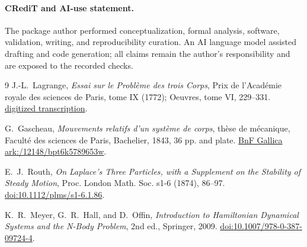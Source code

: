 \documentclass[10pt]{article}
\begin{document}
\paragraph{CRediT and AI-use statement.}
The package author performed conceptualization, formal analysis, software,
validation, writing, and reproducibility curation.  An AI language model
assisted drafting and code generation; all claims remain the author's
responsibility and are exposed to the recorded checks.
\fi

\begin{thebibliography}{9}
J.-L.~Lagrange, \emph{Essai sur le Probl\`eme des trois Corps}, Prix de
l'Acad\'emie royale des sciences de Paris, tome IX (1772); Oeuvres, tome VI,
229--331.  \href{https://fr.wikisource.org/wiki/M%C3%A9moires_extraits_des_recueils_de_l%E2%80%99Acad%C3%A9mie_des_sciences_de_Paris_et_de_l%E2%80%99Institut_de_France/Essai_sur_le_Probl%C3%A8me_des_trois_Corps}{digitized transcription}.

G.~Gascheau, \emph{Mouvements relatifs d'un syst\`eme de corps}, th\`ese de
m\'ecanique, Facult\'e des sciences de Paris, Bachelier, 1843, 36 pp. and plate.
\href{https://gallica.bnf.fr/ark:/12148/bpt6k5789653w}{BnF Gallica ark:/12148/bpt6k5789653w}.

E.~J.~Routh, \emph{On Laplace's Three Particles, with a Supplement on the
Stability of Steady Motion}, Proc. London Math. Soc. s1-6 (1874), 86--97.
\href{https://doi.org/10.1112/plms/s1-6.1.86}{doi:10.1112/plms/s1-6.1.86}.

K.~R.~Meyer, G.~R.~Hall, and D.~Offin, \emph{Introduction to Hamiltonian
Dynamical Systems and the N-Body Problem}, 2nd ed., Springer, 2009.
\href{https://doi.org/10.1007/978-0-387-09724-4}{doi:10.1007/978-0-387-09724-4}.
\end{thebibliography}
\end{document}
